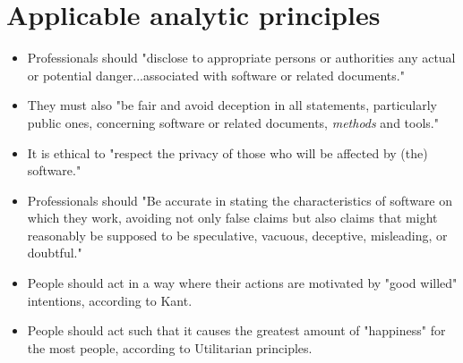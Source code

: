 \documentclass[12pt]{article}
\begin{document}
\section{Applicable analytic principles}
\begin{itemize}
\item Professionals should "disclose to appropriate persons or authorities any actual or potential danger...associated with software or related documents." \cite{secode}
\item They must also "be fair and avoid deception in all statements, particularly public ones, concerning software or related documents, \emph{methods} and tools." \cite{secode}
\item It is ethical to "respect the privacy of those who will be affected by (the) software." \cite{secode}
\item Professionals should "Be accurate in stating the characteristics of software on which they work, avoiding not only false claims but also claims that might reasonably be supposed to be speculative, vacuous, deceptive, misleading, or doubtful." \cite{secode}
\item People should act in a way where their actions are motivated by "good willed" intentions, according to Kant. \cite{kant}
\item People should act such that it causes the greatest amount of "happiness" for the most people, according to Utilitarian principles. \cite{util}
\end{itemize}

\end{document}
